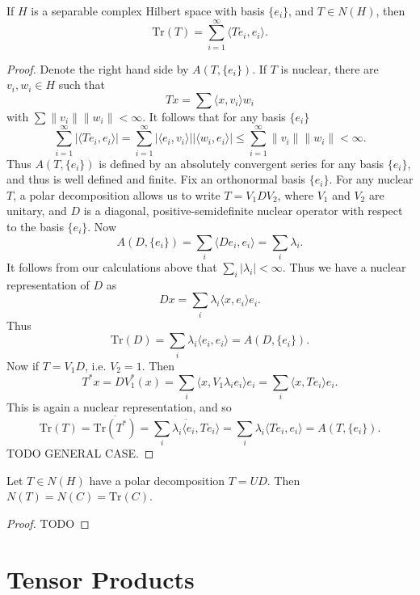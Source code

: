 \begin{theorem}
    If $H$ is a separable complex Hilbert space with basis $\{ e_i \}$, and $T \in N(H)$, then
    \[ \text{Tr}(T) = \sum_{i = 1}^\infty \langle Te_i, e_i \rangle. \]
\end{theorem}
\begin{proof}
    Denote the right hand side by $A(T,\{ e_i \})$. If $T$ is nuclear, there are $v_i, w_i \in H$ such that
    \[ Tx = \sum \langle x, v_i \rangle w_i \]
    with $\sum \| v_i \| \| w_i \| < \infty$. It follows that for any basis $\{ e_i \}$
    \[ \sum_{i = 1}^\infty |\langle Te_i, e_i \rangle| = \sum_{i = 1}^\infty |\langle e_i, v_i \rangle| |\langle w_i, e_i \rangle| \leq \sum_{i = 1}^\infty \| v_i \| \| w_i \| < \infty. \]
    Thus $A(T, \{ e_i \})$ is defined by an absolutely convergent series for any basis $\{ e_i \}$, and thus is well defined and finite. Fix an orthonormal basis $\{ e_i \}$. For any nuclear $T$, a polar decomposition allows us to write $T = V_1DV_2$, where $V_1$ and $V_2$ are unitary, and $D$ is a diagonal, positive-semidefinite nuclear operator with respect to the basis $\{ e_i \}$. Now
    \[ A(D, \{ e_i \}) = \sum_i \langle De_i, e_i \rangle = \sum_i \lambda_i.  \]
    It follows from our calculations above that $\sum_i |\lambda_i| < \infty$. Thus we have a nuclear representation of $D$ as
    \[ Dx = \sum_i \lambda_i \langle x, e_i \rangle e_i. \]
    Thus
    \[ \text{Tr}(D) = \sum_i \lambda_i \langle e_i, e_i \rangle = A(D, \{ e_i \}). \]
    Now if $T = V_1D$, i.e. $V_2 = 1$. Then
    \[ T^*x = DV_1^*(x) = \sum_i \langle x, V_1 \lambda_i e_i \rangle e_i = \sum_i \langle x, Te_i \rangle e_i. \]
    This is again a nuclear representation, and so
    \[ \text{Tr}(T) = \overline{\text{Tr}(T^*)} = \overline{\sum_i \lambda_i \langle e_i, Te_i \rangle} = \sum_i \lambda_i \langle Te_i, e_i \rangle = A(T, \{ e_i \}). \]
    TODO GENERAL CASE.
\end{proof}

\begin{theorem}
    Let $T \in N(H)$ have a polar decomposition $T = UD$. Then $N(T) = N(C) = \text{Tr}(C)$.
\end{theorem}
\begin{proof}
    TODO
\end{proof}








\section{Tensor Products}

